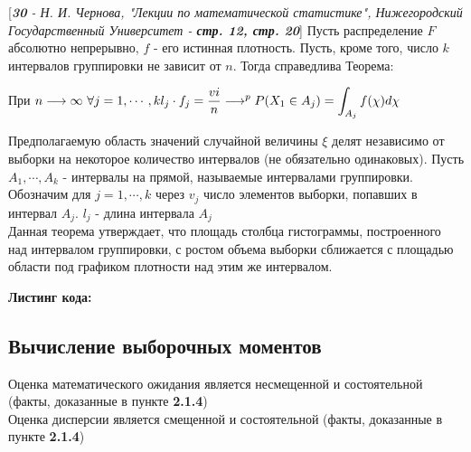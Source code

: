 \documentclass[14pt,a4paper,oneside]{extbook}
\begin{document}
      [\textit{\textbf{30} - Н. И. Чернова, "Лекции по математической статистике", Нижегородский Государственный Университет - \textbf{стр. 12, стр. 20}}] Пусть распределение $F$ абсолютно непрерывно, $f$ - его истинная плотность. Пусть, кроме того, число $k$ интервалов группировки не зависит от $n$. Тогда справедлива Теорема:\\
      \begin{center}
          При $\displaystyle n \longrightarrow \infty \textrm{  } \forall j = 1,\cdots,k \\
          \displaystyle l_{j}\cdot f_{j} = \frac{v{i}}{n} \longrightarrow^{p} P(X_{1} \in A_{j}) = \int_{A_{j}}f(\chi)d\chi$
      \end{center}
    Предполагаемую область значений случайной величины $\xi$ делят независимо от выборки на некоторое количество интервалов (не обязательно одинаковых). Пусть $A_{1},\cdots, A_{k}$ - интервалы на прямой, называемые интервалами группировки. Обозначим для $j = 1,\cdots,k$ через $v_{j}$ число элементов выборки, попавших в интервал $A_{j}$. $l_{j}$ - длина интервала $A_{j}$\\
    Данная теорема утверждает, что площадь столбца гистограммы, построенного над интервалом группировки, с ростом объема выборки сближается с площадью области под графиком плотности над этим же интервалом.
  \begin{center}
    \end{center}

    \textbf{Листинг кода:} \\
    
    
    \newpage
    \subsection{Вычисление выборочных моментов}
    Оценка математического ожидания является несмещенной и состоятельной (факты, доказанные в пункте \textbf{2.1.4})\\
    Оценка дисперсии является смещенной и состоятельной (факты, доказанные в пункте \textbf{2.1.4})\\
    
\end{document}
